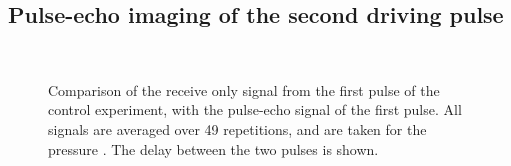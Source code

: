 \subsection{Pulse-echo imaging of the second driving pulse}




\begin{figure}[t]%
  \centering
 \quad\hspace{3mm}
  \\
 \quad\hspace{3mm}
\caption{
    Comparison of the  receive only signal from the first pulse of the control experiment,
    with the pulse-echo signal of the first pulse.
    All signals are averaged over 49 repetitions, and are taken for the pressure \pOOE.
    The delay between the two pulses is shown.
  }
  \label{fig:2nd:av:time:comp:control}
\end{figure}




